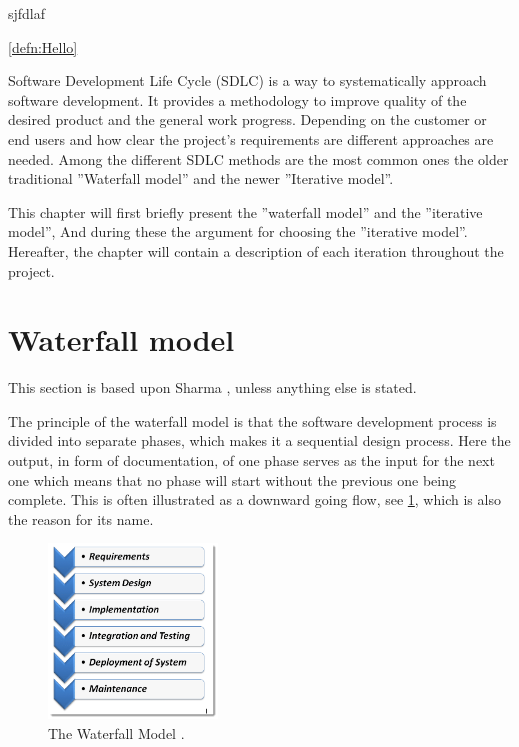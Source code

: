 \begin{defn} \label{defn:Hello}
	sjfdlaf
\end{defn}

\cref{defn:Hello}


Software Development Life Cycle (SDLC) is a way to systematically approach software development.
It provides a methodology to improve quality of the desired product and the general work progress. 
Depending on the customer or end users and how clear the project's requirements are different approaches are needed. 
Among the different SDLC methods are the most common ones the older traditional ''Waterfall model'' and the newer ''Iterative model''. \cite{SDLC-Toolsqa}


This chapter will first briefly present the ''waterfall model'' and the ''iterative model'', And during these the argument for choosing the ''iterative model''.
Hereafter, the chapter will contain a description of each iteration throughout the project.


\section{Waterfall model}
This section is based upon Sharma \cite{Waterfall-Toolsqa}, unless anything else is stated.

The principle of the waterfall model is that the software development process is divided into separate phases, which makes it a sequential design process.
Here the output, in form of documentation, of one phase serves as the input for the next one which means that no phase will start without the previous one being complete.
This is often illustrated as a downward going flow, see \cref{fig:Waterfall}, which is also the reason for its name.

\begin{figure}[H]
	\centering
	\includegraphics[width=0.4\textwidth]{billeder/WaterFall-Model.png}
	\caption{The Waterfall Model \cite{Waterfall-Toolsqa}.}\label{fig:Waterfall}
\end{figure}

